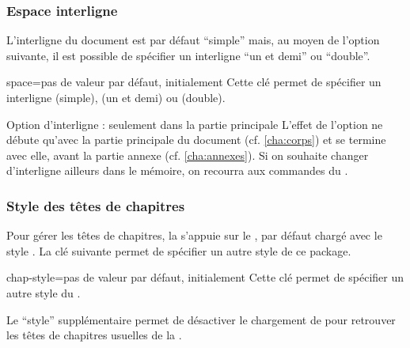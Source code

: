 \subsubsection{Espace interligne}\label{sec:interligne}

L'interligne du document est par défaut \enquote{simple} mais, au moyen de
l'option  suivante, il est possible de spécifier un interligne
\enquote{un et demi} ou \enquote{double}.

\begin{docKey}{space}{=\textbar{}\textbar{}}{pas de valeur par défaut,
    initialement }
  Cette clé permet de spécifier un interligne  (simple),
   (un et demi) ou  (double).
\end{docKey}

\begin{dbwarning}{Option d'interligne : seulement dans la partie
    principale}{}
  L'effet de l'option  ne débute qu'avec la partie principale du
  document (cf. \vref{cha:corps}) et se termine avec elle, avant la partie
  annexe (cf. \vref{cha:annexes}). Si on souhaite changer d'interligne ailleurs
  dans le mémoire, on recourra aux commandes du 
  .
\end{dbwarning}

\subsubsection{Style des têtes de chapitres}\label{sec:style-des-tetes}

Pour gérer les têtes de chapitres, la \yatcl{} s'appuie sur le
, par défaut chargé avec le style . La
clé  suivante permet de spécifier un autre style de ce
package.
%
{%
  \begin{docKey}{chap-style}{=\textbar{}\textbar{}\textbar{}\textbar{}\textbar{}\textbar{}\textbar{}\textbar{}}{pas
      de valeur par défaut, initialement }
    Cette clé permet de spécifier un autre style du .

    Le \enquote{style} supplémentaire  permet de désactiver le
    chargement de  pour retrouver les têtes de chapitres
    usuelles de la .
  \end{docKey}
}

